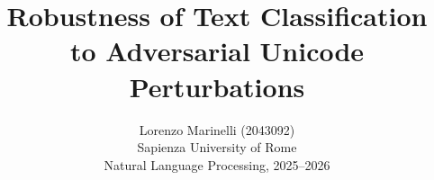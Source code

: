 \documentclass[11pt]{article}
\title{Robustness of Text Classification\\to Adversarial Unicode Perturbations}
\author{Lorenzo Marinelli (2043092)\\Sapienza University of Rome\\Natural Language Processing, 2025--2026}
\date{}
\begin{document}
\maketitle
\begin{abstract}

\end{abstract}






\FloatBarrier

\FloatBarrier

\FloatBarrier

\FloatBarrier





\end{document}
